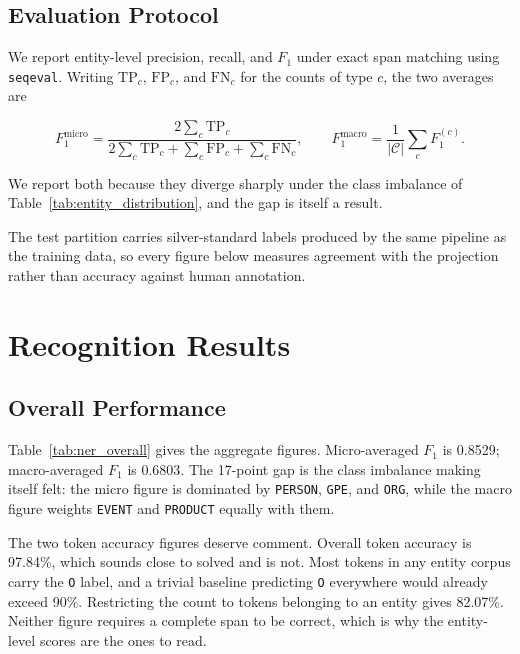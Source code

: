 \documentclass[acmsmall,screen,review]{acmart}
\begin{document}
\subsection{Evaluation Protocol}
\label{sec:model:eval}

We report entity-level precision, recall, and $F_1$ under exact span matching
using \texttt{seqeval}. Writing $\mathrm{TP}_c$, $\mathrm{FP}_c$, and
$\mathrm{FN}_c$ for the counts of type $c$, the two averages are

\begin{equation}
\label{eq:microf1}
F_1^{\mathrm{micro}} =
\frac{2 \sum_{c} \mathrm{TP}_c}
     {2 \sum_{c} \mathrm{TP}_c + \sum_{c} \mathrm{FP}_c + \sum_{c} \mathrm{FN}_c},
\qquad
F_1^{\mathrm{macro}} = \frac{1}{|\mathcal{C}|} \sum_{c} F_1^{(c)} .
\end{equation}

We report both because they diverge sharply under the class imbalance of
Table~\ref{tab:entity_distribution}, and the gap is itself a result.

The test partition carries silver-standard labels produced by the same pipeline
as the training data, so every figure below measures agreement with the
projection rather than accuracy against human annotation.

\section{Recognition Results}
\label{sec:nereval}

\subsection{Overall Performance}
\label{sec:nereval:overall}

Table~\ref{tab:ner_overall} gives the aggregate figures. Micro-averaged $F_1$ is
0.8529; macro-averaged $F_1$ is 0.6803. The 17-point gap is the class imbalance
making itself felt: the micro figure is dominated by \texttt{PERSON},
\texttt{GPE}, and \texttt{ORG}, while the macro figure weights \texttt{EVENT}
and \texttt{PRODUCT} equally with them.

The two token accuracy figures deserve comment. Overall token accuracy is
97.84\%, which sounds close to solved and is not. Most tokens in any entity
corpus carry the \texttt{O} label, and a trivial baseline predicting \texttt{O}
everywhere would already exceed 90\%. Restricting the count to tokens belonging
to an entity gives 82.07\%. Neither figure requires a complete span to be
correct, which is why the entity-level scores are the ones to read.
\end{document}
